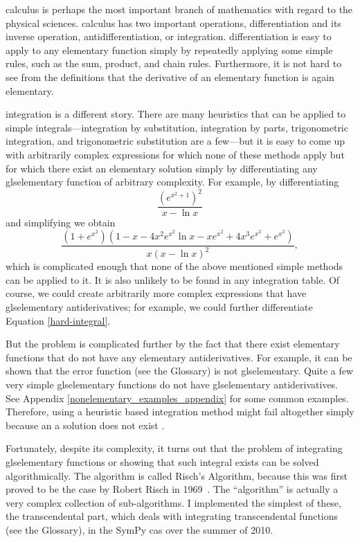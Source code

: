 \Gls{calculus} is perhaps the most important branch of mathematics with
regard to the physical sciences.  \Gls{calculus} has two important
operations, \gls{differentiation} and its inverse operation,
antidifferentiation, or \gls{integration}.  \Gls{differentiation} is
easy to apply to any \gls{elementary} function simply by repeatedly
applying some simple rules, such as the sum, product, and chain rules.
Furthermore, it is not hard to see from the definitions that the
derivative of an \gls{elementary} function is again \gls{elementary}.

\Gls{integration} is a different story.  There are many heuristics that
can be applied to simple integrals---\gls{integration} by substitution,
\gls{integration} by parts, trigonometric \gls{integration}, and
trigonometric substitution are a few---but it is easy to come up with
arbitrarily complex expressions for which none of these methods apply
but for which there exist an \gls{elementary} solution simply by
differentiating any gls{elementary} function of arbitrary complexity.  For
example, by differentiating
\begin{equation}
\label{hard-integral-sol}
    \frac{\left(e^{x^{2} + 1}\right)^{2}}{x - \ln{x}}
\end{equation}
and simplifying we obtain
\begin{equation}
\label{hard-integral}
    \frac{\left(1 + e^{x^{2}}\right) \left(1 - x - 4 x^{2} e^{x^{2}}
    \ln{x} - x e^{x^{2}} + 4 x^{3} e^{x^{2}} +
    e^{x^{2}}\right)}{x \left(x -
    \ln{x}\right)^{2}},
\end{equation}
which is complicated enough that none of the above mentioned simple
methods can be applied to it.  It is also unlikely to be found in any
integration table.  Of course, we could create arbitrarily more complex
expressions that have gls{elementary} antiderivatives; for example, we
could further differentiate Equation \ref{hard-integral}. 

But the problem is complicated further by the fact that there exist
\gls{elementary} functions that do not have any \gls{elementary}
antiderivatives.  For example, it can be shown that the \gls{error
function} (see the Glossary) is not gls{elementary}.  Quite a few very simple
gls{elementary} functions do not have gls{elementary} antiderivatives.  See
Appendix \ref{nonelementary_examples_appendix} for some common examples.
Therefore, using a heuristic based \gls{integration} method might fail
altogether simply because an a solution does not exist .

Fortunately, despite its complexity, it turns out that the problem of
integrating gls{elementary} functions or showing that such integral exists
can be solved algorithmically.  The algorithm is called Risch's
Algorithm, because this was first proved to be the case by Robert Risch
in 1969~\cite{risch1969problem}.  The ``algorithm'' is actually a very
complex collection of sub-algorithms.  I implemented the simplest of
these, the \gls{transcendental} part, which deals with integrating
\gls{transcendental} functions (see the Glossary), in the SymPy
\gls{cas} over the summer of 2010.
